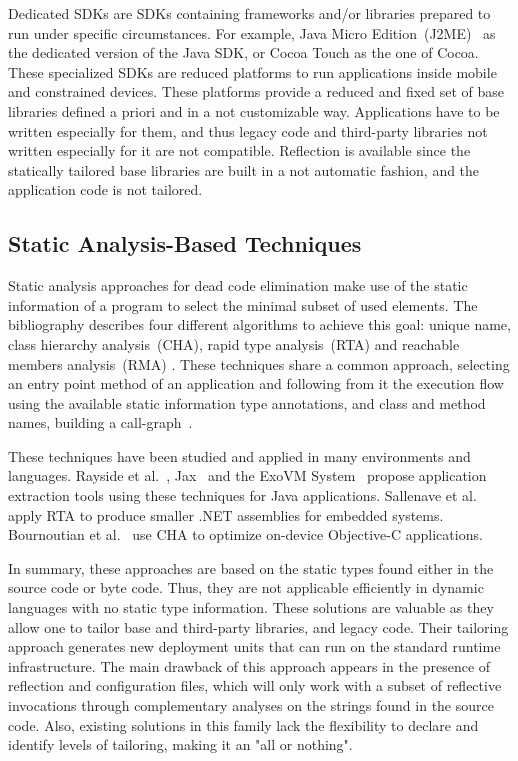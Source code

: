 Dedicated SDKs are SDKs containing frameworks and/or libraries prepared to run under specific circumstances. For example, Java Micro Edition~(J2ME)~\cite{JavaME} as the dedicated version of the Java SDK, or Cocoa Touch as the one of Cocoa. These specialized SDKs are reduced platforms to run applications inside mobile and constrained devices. These platforms provide a reduced and fixed set of base libraries defined a priori and in a not customizable way. Applications have to be written especially for them, and thus legacy code and third-party libraries not written especially for it are not compatible. Reflection is available since the statically tailored base libraries are built in a not automatic fashion, and the application code is not tailored.

\subsection{Static Analysis-Based Techniques}\label{section:static_rw}

Static analysis approaches for dead code elimination make use of the static information of a program to select the minimal subset of used elements. The bibliography describes four different algorithms to achieve this goal: unique name, class hierarchy analysis~(CHA), rapid type analysis~(RTA) and reachable members analysis~(RMA) \cite{Baco96a, Titz06a}. These techniques share a common approach, selecting an entry point method of an application and following from it the execution flow using the available static information \ie type annotations, and class and method names, building a call-graph~\cite{ShortGrov97a}.

These techniques have been studied and applied in many environments and languages. Rayside et al.~\cite{ShortRays02a}, Jax~\cite{ShortTip03a} and the ExoVM System~\cite{Titz06a} propose application extraction tools using these techniques for Java applications. Sallenave et al.~\cite{Sall10a} apply RTA to produce smaller .NET assemblies for embedded systems. Bournoutian et al.~\cite{Bour14a} use CHA to optimize on-device Objective-C applications.

In summary, these approaches are based on the static types found either in the source code or byte code. Thus, they are not applicable efficiently in dynamic languages with no static type information. These solutions are valuable as they allow one to tailor base and third-party libraries, and legacy code. Their tailoring approach generates new deployment units that can run on the standard runtime infrastructure. The main drawback of this approach appears in the presence of reflection and configuration files, which will only work with a subset of reflective invocations through complementary analyses on the strings found in the source code. Also, existing solutions in this family lack the flexibility to declare and identify levels of tailoring, making it an "all or nothing".

